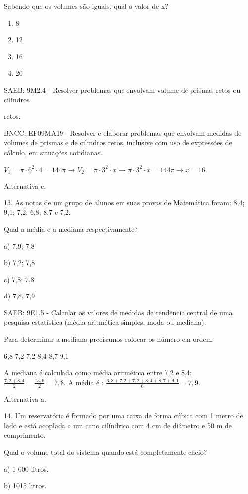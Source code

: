 \begin{escolha}
{{{\begin{escolha}
{{{{{\begin{escolha}
\begin{escolha}
{\begin{q°}
Sabendo que os volumes são iguais, qual o valor de x?

\begin{enumerate}

\item
  8
\item
  12
\item
  16
\item
  20
\end{enumerate}

SAEB: 9M2.4 - Resolver problemas que envolvam volume de prismas retos ou
cilindros

retos.

BNCC: EF09MA19 - Resolver e elaborar problemas que envolvam medidas de
volumes de prismas e de cilindros retos, inclusive com uso de expressões
de cálculo, em situações cotidianas.

\(V_{1} = \pi \cdot 6^{2} \cdot 4 = 144\pi\) →
\(V_{2} = \pi \cdot 3^{2} \cdot x\) →
\(\pi \cdot 3^{2} \cdot x = 144\pi \rightarrow x = 16.\)

Alternativa c.

13. As notas de um grupo de alunos em suas provas de Matemática foram:
8,4; 9,1; 7,2; 6,8; 8,7 e 7,2.

Qual a média e a mediana respectivamente?

a) 7,9; 7,8

b) 7,2; 7,8

c) 7,8; 7,8

d) 7,8; 7,9

SAEB: 9E1.5 - Calcular os valores de medidas de tendência central de uma
pesquisa estatística (média aritmética simples, moda ou mediana).

Para determinar a mediana precisamos colocar os número em ordem:

6,8 7,2 7,2 8,4 8,7 9,1

A mediana é calculada como média aritmética entre 7,2 e 8,4:
\(\frac{7,2 + 8,4}{2} = \frac{15,6}{2} = 7,8\). A média é :
\(\frac{6,8 + 7,2 + 7,2 + 8,4 + 8,7 + 9,1}{6} = 7,9\).

Alternativa a.

14. Um reservatório é formado por uma caixa de forma cúbica com 1 metro
de lado e está acoplada a um cano cilíndrico com 4 cm de diâmetro e 50 m
de comprimento.

Qual o volume total do sistema quando está completamente cheio?

a) 1 000 litros.

b) 1015 litros.


\end{q°}}
\end{escolha}
\end{escolha}}}}}}
\end{escolha}}}}
\end{escolha}

